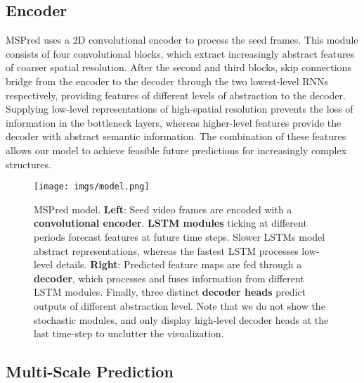 \documentclass{bmvc2k}
\begin{document}
\subsection{Encoder}
\label{section: encoder}


MSPred uses a 2D convolutional encoder to process the seed frames.  This module consists of four convolutional blocks, which extract increasingly abstract features of coarser spatial resolution.
After the second and third blocks, skip connections bridge from the encoder to the decoder through the two lowest-level RNNs respectively, providing features of different levels of abstraction to the decoder.
Supplying low-level representations of high-spatial resolution prevents the loss of information in the bottleneck layers, whereas higher-level features provide the decoder with abstract semantic information. The combination of these features allows our model to achieve feasible future predictions for increasingly complex structures.



\begin{figure*}[t]
	\begin{center}
		\centering
		\texttt{[image: imgs/model.png]}
		\vspace{-0.2cm}
		\caption{
MSPred model.
\textbf{Left}: Seed video frames are encoded with a {\color{Dandelion} \textbf{convolutional encoder}}.
{\color{Salmon} \textbf{LSTM modules}} ticking at different periods forecast features at future time steps. Slower LSTMs model abstract representations, whereas the fastest LSTM processes low-level details.
\textbf{Right}: Predicted feature maps are fed through a {\color{RoyalBlue} \textbf{decoder}}, which processes and fuses information from different LSTM modules.
Finally, three distinct {\color{RoyalBlue} \textbf{decoder heads}} predict outputs of different abstraction level.
Note that we do not show the stochastic modules, and only display high-level decoder heads at the last time-step to unclutter the visualization.
		}
		\label{fig:model}
	\end{center}
	\vspace{-0.5cm}
\end{figure*}



\vspace{-0.2cm}
\subsection{Multi-Scale Prediction}
\label{section: predictor}
\end{document}
